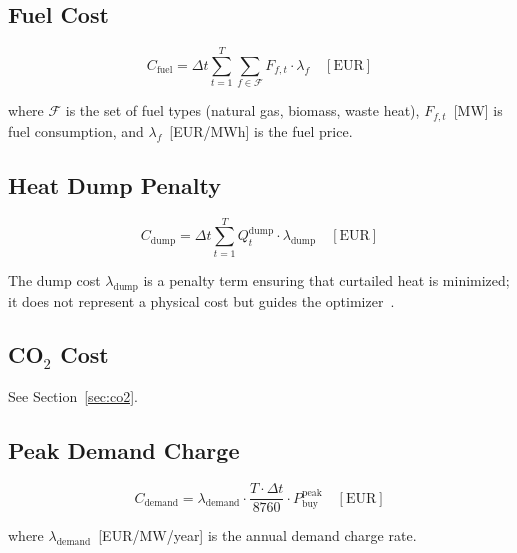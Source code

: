 \documentclass[a4paper,12pt]{article}
\begin{document}
\subsection{Fuel Cost}

\begin{equation}
  C_{\text{fuel}}
  = \Delta t \sum_{t=1}^{T} \sum_{f \in \mathcal{F}} F_{f,t} \cdot \lambda_{f}
  \quad [\text{EUR}]
  \label{eq:fuel-cost}
\end{equation}

where $\mathcal{F}$ is the set of fuel types (natural gas, biomass, waste heat),
$F_{f,t}$~[MW] is fuel consumption, and $\lambda_{f}$~[EUR/MWh] is the fuel price.

\subsection{Heat Dump Penalty}

\begin{equation}
  C_{\text{dump}}
  = \Delta t \sum_{t=1}^{T} Q^{\text{dump}}_{t} \cdot \lambda_{\text{dump}}
  \quad [\text{EUR}]
  \label{eq:dump-cost}
\end{equation}

The dump cost $\lambda_{\text{dump}}$ is a penalty term ensuring that curtailed heat is
minimized; it does not represent a physical cost but guides the optimizer~\cite{Pfenninger2014}.

\subsection{CO\texorpdfstring{$_2$}{2} Cost}

See Section~\ref{sec:co2}.

\subsection{Peak Demand Charge}

\begin{equation}
  C_{\text{demand}}
  = \lambda_{\text{demand}} \cdot \frac{T \cdot \Delta t}{8760}
    \cdot P_{\text{buy}}^{\text{peak}}
  \quad [\text{EUR}]
  \label{eq:demand-charge}
\end{equation}

where $\lambda_{\text{demand}}$~[EUR/MW/year] is the annual demand charge rate.
\end{document}

